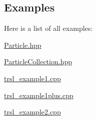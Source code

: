 \subsection{Examples}
Here is a list of all examples:\begin{DoxyCompactItemize}
\item 
\hyperlink{Particle_8hpp-example}{Particle.hpp}
\item 
\hyperlink{ParticleCollection_8hpp-example}{ParticleCollection.hpp}
\item 
\hyperlink{trsl__example1_8cpp-example}{trsl\_\-example1.cpp}
\item 
\hyperlink{trsl__example1plus_8cpp-example}{trsl\_\-example1plus.cpp}
\item 
\hyperlink{trsl__example2_8cpp-example}{trsl\_\-example2.cpp}
\end{DoxyCompactItemize}

